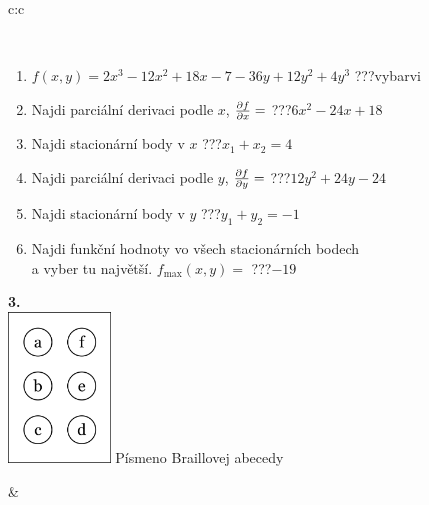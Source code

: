 \documentclass[10pt]{report}
\begin{document}
\begin{tabular}{c:c}
\begin{minipage}[c][104.5mm][t]{0.5\linewidth}
\begin{center}
\begin{minipage}{0.95\linewidth}
\begin{center}
\end{center}
\end{minipage}
\\[1mm]
\begin{minipage}{0.79\linewidth}
\begin{center}
\begin{varwidth}{\linewidth}
\begin{enumerate}
\normalsize
\item $f(x,y)=2x^3-12x^2+18x-7-36y+12y^2+4y^3$\quad \dotfill\; ???\;\dotfill \quad vybarvi
\item Najdi parciální derivaci podle $x$, $\pdv{f}{x}=$\quad \dotfill\; ???\;\dotfill \quad $6x^2-24x+18$
\item Najdi stacionární body v $x$\quad \dotfill\; ???\;\dotfill \quad $x_1+x_2=4$
\item Najdi parciální derivaci podle $y$, $\pdv{f}{y}=$\quad \dotfill\; ???\;\dotfill \quad $12y^2+24y-24$
\item Najdi stacionární body v $y$\quad \dotfill\; ???\;\dotfill \quad $y_1+y_2=-1$
\item Najdi funkční hodnoty vo všech stacionárních bodech \\ \phantom{xxxxxx} a vyber tu najvětší. $f_{\text{max}}(x,y)=$\quad \dotfill\; ???\;\dotfill \quad $-19$
\end{enumerate}
\end{varwidth}
\end{center}
\end{minipage}
\begin{minipage}{0.20\linewidth}
\begin{center}
{\Huge\bfseries 3.} \\[2mm]
\includegraphics[height=40mm]{../images/braille.png}
{\small Písmeno Braillovej abecedy}
\end{center}
\end{minipage}
\end{center}
\end{minipage}
&
\begin{minipage}[c][104.5mm][t]{0.5\linewidth}
\begin{center}

\end{center}
\end{minipage}
\end{tabular}
\end{document}
